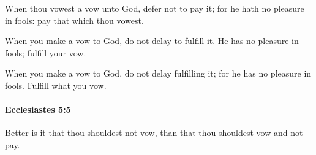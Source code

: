 			\begin{versebox}
					\item[BHS] 
					\item[LXX] 
					\item[ASV] When thou vowest a vow unto God, defer not to pay it; for he hath no pleasure in fools: pay that which thou vowest.
					\item[NIV] When you make a vow to God, do not delay to fulfill it. He has no pleasure in fools; fulfill your vow.
					\item[NRSV] When you make a vow to God, do not delay fulfilling it; for he has no pleasure in fools. Fulfill what you vow.
			\end{versebox}

		\paragraph{Ecclesiastes 5:5} %
			\label{ECCLESIASTES-5-5}

			Better is it that thou shouldest not vow, than that thou shouldest vow and not pay.

